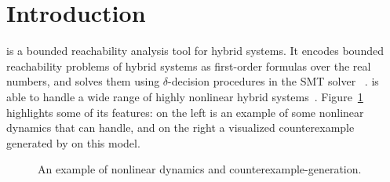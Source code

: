 \section{Introduction}\label{sec:intro}


\dReach{} is a bounded reachability analysis tool for hybrid systems.
It encodes bounded reachability problems of hybrid systems as
first-order formulas over the real numbers, and solves them using
$\delta$-decision procedures in the SMT solver
\dReal{}~\cite{DBLP:conf/cade/GaoKC13}. \dReach{} is able to handle a
wide range of highly nonlinear hybrid systems~\cite{CMSB14,DBLP:conf/fmcad/GaoKC13,DBLP:conf/hybrid/KapinskiDSA14,6868816}.
Figure~\ref{fig:prostate-example} highlights some of its features: on
the left is an example of some nonlinear dynamics that \dReach{} can
handle, and on the right a visualized counterexample generated by
\dReach{} on this model.
\begin{figure}[!h]
  \hfill
  \caption{An example of nonlinear dynamics and counterexample-generation.}
  \label{fig:prostate-example}
\end{figure}

